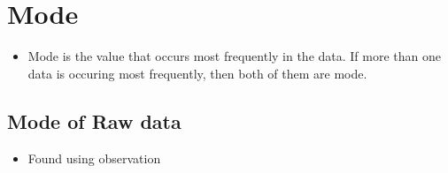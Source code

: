 \documentclass[8pt]{report}
\begin{document}
	\section{Mode}
		\begin{itemize}
			\item Mode is the value that occurs most frequently in the data. If more than one data is occuring most frequently, then both of them are mode.
		\end{itemize}
		\subsection{Mode of Raw data}
			\begin{itemize}
				\item Found using observation
			\end{itemize}\hrulefill
\end{document}
